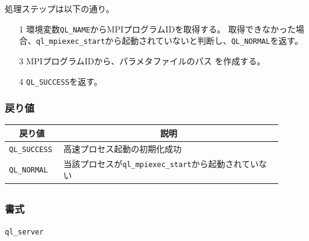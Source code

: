 \documentclass[twoside,11pt,fleqn]{book}
\begin{document}
処理ステップは以下の通り。
\begin{itemize}
\item[1]環境変数\texttt{QL\_NAME}からMPIプログラムIDを取得する。
取得できなかった場合、\texttt{ql\_mpiexec\_start}から起動されていないと判断し、\texttt{QL\_NORMAL}を返す。
\item[3]MPIプログラムIDから、パラメタファイルのパス
を作成する。
\item[4]\texttt{QL\_SUCCESS}を返す。
\end{itemize}
\FloatBarrier

\subsubsection*{戻り値}{\quad}
\begin{table}[!ht]
\footnotesize
\begin{tabular}{|p{0.15\linewidth}|p{0.75\linewidth}|} \hline
\multicolumn{1}{|c}{\textbf{戻り値}}&\multicolumn{1}{|c|}{\textbf{説明}}\\ \hline \hline
\texttt{QL\_SUCCESS}&高速プロセス起動の初期化成功\\ \hline
\texttt{QL\_NORMAL}&当該プロセスが\texttt{ql\_mpiexec\_start}から起動されていない\\ \hline
\end{tabular}
\vspace{-0em}
\end{table}
\FloatBarrier

\subsection{}
\subsubsection*{書式}{\quad} \texttt{ql\_server}
\end{document}
